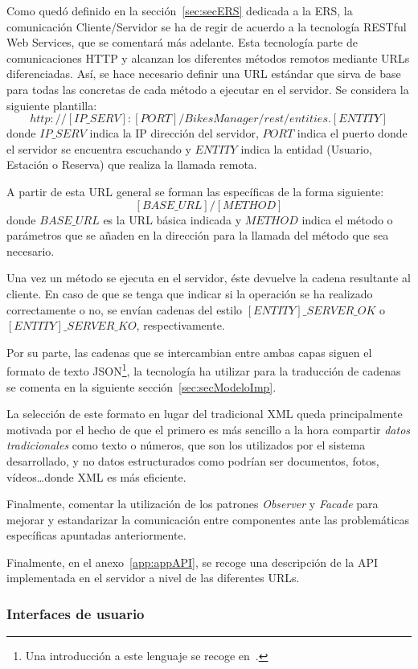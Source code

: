 Como quedó definido en la sección~\ref{sec:secERS} dedicada a la ERS, la comunicación Cliente/Servidor se ha de regir de acuerdo a la tecnología RESTful Web Services, que se comentará más adelante. Esta tecnología parte de comunicaciones HTTP y alcanzan los diferentes métodos remotos mediante URLs diferenciadas. Así, se hace necesario definir una URL estándar que sirva de base para todas las concretas de cada método a ejecutar en el servidor. Se considera la siguiente plantilla: $$http://[IP\_SERV]:[PORT]/BikesManager/rest/entities.[ENTITY]$$
donde $IP\_SERV$ indica la IP dirección del servidor, $PORT$ indica el puerto donde el servidor se encuentra escuchando y $ENTITY$ indica la entidad (Usuario, Estación o Reserva) que realiza la llamada remota.

A partir de esta URL general se forman las específicas de la forma siguiente: $$[BASE\_URL]/[METHOD]$$
donde $BASE\_URL$ es la URL básica indicada y $METHOD$ indica el método o parámetros que se añaden en la dirección para la llamada del método que sea necesario.

Una vez un método se ejecuta en el servidor, éste devuelve la cadena resultante al cliente. En caso de que se tenga que indicar si la operación se ha realizado correctamente o no, se envían cadenas del estilo $[ENTITY]\_SERVER\_OK$ o $[ENTITY]\_SERVER\_KO$, respectivamente. 

Por su parte, las cadenas que se intercambian entre ambas capas siguen el formato de texto JSON\footnote{Una introducción a este lenguaje se recoge en~\cite{JSON}.}, la tecnología ha utilizar para la traducción de cadenas se comenta en la siguiente sección~\ref{sec:secModeloImp}.

La selección de este formato en lugar del tradicional XML queda principalmente motivada por el hecho de que el primero es más sencillo a la hora compartir \emph{datos tradicionales} como texto o números, que son los utilizados por el sistema desarrollado, y no datos estructurados como podrían ser documentos, fotos, vídeos\dots donde XML es más eficiente.

Finalmente, comentar la utilización de los patrones \emph{Observer} y \emph{Facade} para mejorar y estandarizar la comunicación entre componentes ante las problemáticas específicas apuntadas anteriormente.

Finalmente, en el anexo~\ref{app:appAPI}, se recoge una descripción de la API implementada en el servidor a nivel de las diferentes URLs.


\subsubsection{Interfaces de usuario}

